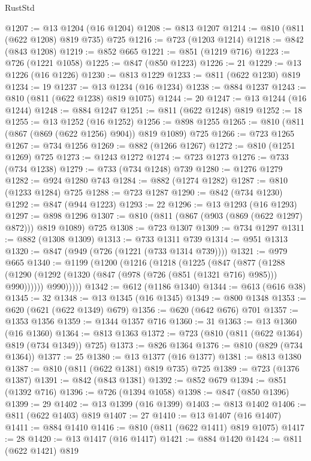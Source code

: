 \begin{lexlean}{RustStd}
\begin{coremodule}
@1207 := @13 @1204 (@16 @1204)
@1208 := @813 @1207
@1214 := @810 (@811 (@622 @1208) @819 @735) @725
@1216 := @723 (@1203 @1214)
@1218 := @842 (@843 @1208)
@1219 := @852 @665
@1221 := @851 (@1219 @716)
@1223 := @726 (@1221 @1058)
@1225 := @847 (@850 @1223)
@1226 := 21
@1229 := @13 @1226 (@16 @1226)
@1230 := @813 @1229
@1233 := @811 (@622 @1230) @819
@1234 := 19
@1237 := @13 @1234 (@16 @1234)
@1238 := @884 @1237
@1243 := @810 (@811 (@622 @1238) @819 @1075)
@1244 := 20
@1247 := @13 @1244 (@16 @1244)
@1248 := @884 @1247
@1251 := @811 (@622 @1248) @819
@1252 := 18
@1255 := @13 @1252 (@16 @1252)
@1256 := @898 @1255
@1265 := @810 (@811 (@867 (@869 (@622 @1256) @904)) @819 @1089) @725
@1266 := @723 @1265
@1267 := @734 @1256
@1269 := @882 (@1266 @1267)
@1272 := @810 (@1251 @1269) @725
@1273 := @1243 @1272
@1274 := @723 @1273
@1276 := @733 (@734 @1238)
@1279 := @733 (@734 @1248) @739
@1280 := @1276 @1279
@1282 := @924 @1280 @743
@1284 := @882 (@1274 @1282)
@1287 := @810 (@1233 @1284) @725
@1288 := @723 @1287
@1290 := @842 (@734 @1230)
@1292 := @847 (@944 @1223)
@1293 := 22
@1296 := @13 @1293 (@16 @1293)
@1297 := @898 @1296
@1307 := @810 (@811 (@867 (@903 (@869 (@622 @1297) @872))) @819 @1089) @725
@1308 := @723 @1307
@1309 := @734 @1297
@1311 := @882 (@1308 @1309)
@1313 := @733 @1311 @739
@1314 := @951 @1313
@1320 := @847 (@949 (@726 (@1221 (@733 @1314 @739))))
@1321 := @979 @665
@1340 := @1199
    (@1200
      (@1216
        (@1218
          (@1225
            (@847
              (@877
                (@1288 (@1290 (@1292 (@1320 (@847 (@978 (@726 (@851 (@1321 @716) @985))) @990))))))
              @990)))))
@1342 := @612 (@1186 @1340)
@1344 := @613 (@616 @38)
@1345 := 32
@1348 := @13 @1345 (@16 @1345)
@1349 := @800 @1348
@1353 := @620 (@621 (@622 @1349) @679)
@1356 := @620 (@642 @676) @701
@1357 := @1353 @1356
@1359 := @1344 @1357 @716
@1360 := 31
@1363 := @13 @1360 (@16 @1360)
@1364 := @813 @1363
@1372 := @723 (@810 (@811 (@622 @1364) @819 (@734 @1349)) @725)
@1373 := @826 @1364
@1376 := @810 (@829 (@734 @1364))
@1377 := 25
@1380 := @13 @1377 (@16 @1377)
@1381 := @813 @1380
@1387 := @810 (@811 (@622 @1381) @819 @735) @725
@1389 := @723 (@1376 @1387)
@1391 := @842 (@843 @1381)
@1392 := @852 @679
@1394 := @851 (@1392 @716)
@1396 := @726 (@1394 @1058)
@1398 := @847 (@850 @1396)
@1399 := 29
@1402 := @13 @1399 (@16 @1399)
@1403 := @813 @1402
@1406 := @811 (@622 @1403) @819
@1407 := 27
@1410 := @13 @1407 (@16 @1407)
@1411 := @884 @1410
@1416 := @810 (@811 (@622 @1411) @819 @1075)
@1417 := 28
@1420 := @13 @1417 (@16 @1417)
@1421 := @884 @1420
@1424 := @811 (@622 @1421) @819

\end{coremodule}
\end{lexlean}
